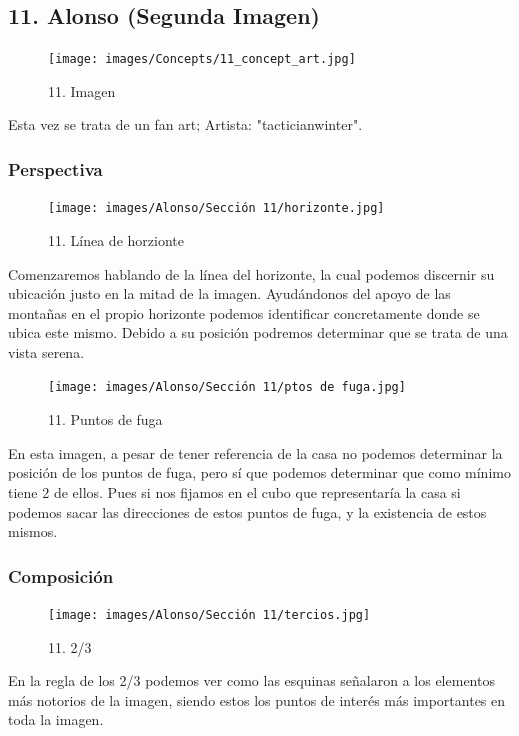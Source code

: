 \documentclass[12pt]{article}
\begin{document}
        \newpage


    \subsection{11. Alonso (Segunda Imagen)}
    \begin{figure}[H]
      \centering
      \texttt{[image: images/Concepts/11\_concept\_art.jpg]}
      \caption{\small 11. Imagen}
    \end{figure}
    Esta vez se trata de un fan art; Artista: "tacticianwinter".

        \subsubsection{Perspectiva}
        \begin{figure}[H]
      \centering
      \texttt{[image: images/Alonso/Sección 11/horizonte.jpg]}
      \caption{\small 11. Línea de horzionte}
    \end{figure}
    Comenzaremos hablando de la línea del horizonte, la cual podemos discernir su ubicación justo en la mitad de la imagen. Ayudándonos del apoyo de las montañas en el propio horizonte podemos identificar concretamente donde se ubica este mismo. Debido a su posición podremos determinar que se trata de una vista serena.

    \begin{figure}[H]
      \centering
      \texttt{[image: images/Alonso/Sección 11/ptos de fuga.jpg]}
      \caption{\small 11. Puntos de fuga}
    \end{figure}
    En esta imagen, a pesar de tener referencia de la casa no podemos determinar la posición de los puntos de fuga, pero sí que podemos determinar que como mínimo tiene 2 de ellos. Pues si nos fijamos en el cubo que representaría la casa si podemos sacar las direcciones de estos puntos de fuga, y la existencia de estos mismos.

        \subsubsection{Composición}
        \begin{figure}[H]
      \centering
      \texttt{[image: images/Alonso/Sección 11/tercios.jpg]}
      \caption{\small 11. 2/3}
    \end{figure}
     En la regla de los 2/3  podemos ver como las esquinas señalaron a los elementos más notorios de la imagen, siendo estos los puntos de interés más importantes en toda la imagen.
\end{document}
